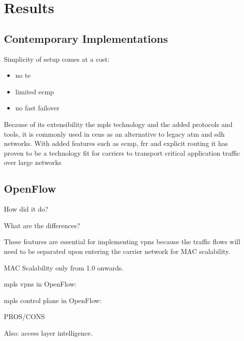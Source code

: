 \section{Results} %
\label{sec:results}

\subsection{Contemporary Implementations} %
\label{sub:contemporary_implementations}

%



Simplicity of setup comes at a cost:
\begin{itemize}
	\item no \ac{te}
	\item limited \ac{ecmp}
	\item no fast failover
\end{itemize}




Because of its extensibility the \ac{mpls} technology and the added protocols and tools, it is commonly used in \acp{cen} as an alternative to legacy \acs{atm} and \acs{sdh} networks. With added features such as \ac{ecmp}, \ac{frr} and explicit routing it has proven to be a technology fit for carriers to transport critical application traffic over large networks


\subsection{OpenFlow} %
\label{sub:openflow}

How did it do?

What are the differences?



These features are essential for implementing \acp{vpn} because the traffic flows will need to be separated upon entering the carrier network for MAC scalability.

MAC Scalability only from 1.0 onwards.


\ac{mpls} \acp{vpn} in OpenFlow: \cite{mpls-vpn-openflow}

\ac{mpls} control plane in OpenFlow: \cite{mpls-open}


PROS/CONS


Also: access layer intelligence.


